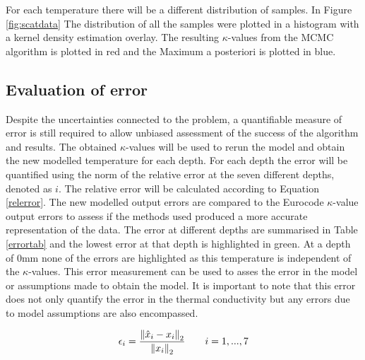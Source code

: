  For each temperature there will be a different distribution of samples. 
 In Figure \ref{fig:scatdata} The distribution of all the samples were plotted in a histogram with a kernel density estimation overlay. 
 The resulting $\kappa$-values from the MCMC algorithm is plotted in red and the Maximum a posteriori is plotted in blue.

%


\subsection{Evaluation of error}
Despite the uncertainties connected to the problem, a quantifiable measure of error is still required to allow unbiased assessment of the success of the algorithm and results.
The obtained $\kappa$-values will be used to rerun the model and obtain the new modelled temperature for each depth. 
For each depth the error will be quantified using the norm of the relative error at the seven different depths, denoted as $i$.
The relative error will be calculated according to  Equation \ref{relerror}. 
The new modelled output errors are compared to the Eurocode $\kappa$-value output errors to assess if the methods used produced a more accurate representation of the data.
The error at different depths are summarised in Table \ref{errortab} and the lowest error at that depth is highlighted in green. 
At a depth of 0mm none of the errors are highlighted as this temperature is independent of the $\kappa$-values.
This error measurement can be used to asses the error in the model or assumptions made to obtain the model.
It is important to note that this error does not only quantify the error in the thermal conductivity but any errors due to model assumptions are also encompassed.

\begin{equation}\label{relerror}
\epsilon _i = \frac{\left\lVert\hat{x}_i-x_i \right\rVert_2}{\left\lVert x_i\right\rVert_2} \quad \quad i= 1, ... ,7
\end{equation}

